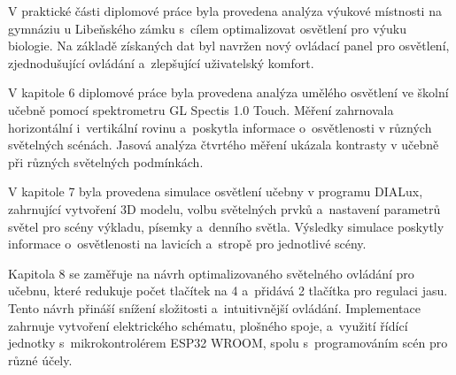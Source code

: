 V praktické části diplomové práce byla provedena analýza výukové místnosti na
gymnáziu u Libeňského zámku s~cílem optimalizovat osvětlení pro výuku biologie.
Na základě získaných dat byl navržen nový ovládací panel pro osvětlení,
zjednodušující ovládání a~zlepšující uživatelský komfort.

V kapitole 6 diplomové práce byla provedena analýza umělého osvětlení ve školní učebně
pomocí spektrometru GL Spectis 1.0 Touch.
Měření zahrnovala horizontální i~vertikální rovinu a~poskytla
informace o~osvětlenosti v různých světelných scénách.
Jasová analýza čtvrtého měření ukázala kontrasty v učebně při různých světelných podmínkách.

V kapitole 7 byla provedena simulace osvětlení učebny v programu DIALux,
zahrnující vytvoření 3D modelu, volbu světelných prvků a~nastavení parametrů
světel pro scény výkladu, písemky a~denního světla.
Výsledky simulace poskytly informace o~osvětlenosti na lavicích a~stropě pro jednotlivé scény.

Kapitola 8 se zaměřuje na návrh optimalizovaného světelného ovládání pro učebnu,
které redukuje počet tlačítek na 4 a~přidává 2 tlačítka pro regulaci jasu.
Tento návrh přináší snížení složitosti a~intuitivnější ovládání.
Implementace zahrnuje vytvoření elektrického schématu, plošného spoje, a~využití
řídící jednotky s~mikrokontrolérem ESP32 WROOM, spolu s~programováním scén pro různé účely.




